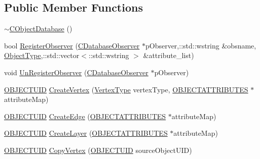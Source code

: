 \subsection*{Public Member Functions}
\begin{DoxyCompactItemize}
\item 
\hyperlink{class_c_object_database_aafcabfcbf56829277b0a7d348ca92947}{$\sim$\+C\+Object\+Database} ()
\item 
bool \hyperlink{class_c_object_database_a8ff1ff15b2318b2985cb7a819a380c9a}{Register\+Observer} (\hyperlink{class_c_database_observer}{C\+Database\+Observer} $\ast$p\+Observer,\+::std\+::wstring \&obsname, \hyperlink{_object_database_defines_8h_a842c5e2e69277690b064bf363c017980}{Object\+Type},\+::std\+::vector$<$\+::std\+::wstring $>$ \&attribute\+\_\+list)
\item 
void \hyperlink{class_c_object_database_a5cd2a2ea23f1b2fd4449314527057014}{Un\+Register\+Observer} (\hyperlink{class_c_database_observer}{C\+Database\+Observer} $\ast$p\+Observer)
\item 
\hyperlink{_object_database_defines_8h_a164ec120b01429b93c9cd0bef2a67e64}{O\+B\+J\+E\+C\+T\+U\+I\+D} \hyperlink{class_c_object_database_ab5da2dc19766d1d3ef888b247e03919c}{Create\+Vertex} (\hyperlink{_object_database_defines_8h_afa099a55c5746eff5a0e1ffc04f53cc0}{Vertex\+Type} vertex\+Type, \hyperlink{_object_database_defines_8h_a52d1b76b66b20eeaf0c5dc8127da21d7}{O\+B\+J\+E\+C\+T\+A\+T\+T\+R\+I\+B\+U\+T\+E\+S} $\ast$attribute\+Map)
\item 
\hyperlink{_object_database_defines_8h_a164ec120b01429b93c9cd0bef2a67e64}{O\+B\+J\+E\+C\+T\+U\+I\+D} \hyperlink{class_c_object_database_a06aed2f22616c9dcffb3ba1839ab427f}{Create\+Edge} (\hyperlink{_object_database_defines_8h_a52d1b76b66b20eeaf0c5dc8127da21d7}{O\+B\+J\+E\+C\+T\+A\+T\+T\+R\+I\+B\+U\+T\+E\+S} $\ast$attribute\+Map)
\item 
\hyperlink{_object_database_defines_8h_a164ec120b01429b93c9cd0bef2a67e64}{O\+B\+J\+E\+C\+T\+U\+I\+D} \hyperlink{class_c_object_database_accd1eb8d54f27727bdce1599871995d7}{Create\+Layer} (\hyperlink{_object_database_defines_8h_a52d1b76b66b20eeaf0c5dc8127da21d7}{O\+B\+J\+E\+C\+T\+A\+T\+T\+R\+I\+B\+U\+T\+E\+S} $\ast$attribute\+Map)
\item 
\hyperlink{_object_database_defines_8h_a164ec120b01429b93c9cd0bef2a67e64}{O\+B\+J\+E\+C\+T\+U\+I\+D} \hyperlink{class_c_object_database_a59f6259914665a2ee19c14e8d8346fec}{Copy\+Vertex} (\hyperlink{_object_database_defines_8h_a164ec120b01429b93c9cd0bef2a67e64}{O\+B\+J\+E\+C\+T\+U\+I\+D} source\+Object\+U\+I\+D)

\end{DoxyCompactItemize}

